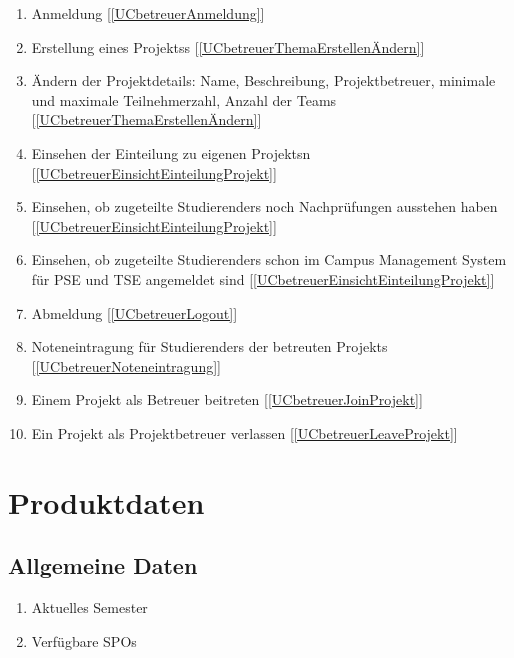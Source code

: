 \documentclass[parskip=full]{scrartcl}
\newcommand{\swtLabel}[1]{\textbf{/#1\arabic*0/}}
\newcommand{\testRef}[1]{[\ref{#1}]}
\begin{document}
\begin{enumerate}[label=\swtLabel{FA}, resume]
  \item Anmeldung  \label{FAbetreuerAnmeldung} \testRef{UCbetreuerAnmeldung}
  \item Erstellung eines \glspl{Projekt}s \label{FAbetreuerAddProjekt}
  \testRef{UCbetreuerThemaErstellenÄndern}
  \item Ändern der \gls{Projektdetails}: Name, Beschreibung, \gls{Projektbetreuer},
        minimale und maximale Teilnehmerzahl, Anzahl der \glspl{Team}
        \label{FAbetreuerChangeProjekt} \testRef{UCbetreuerThemaErstellenÄndern}%
  \item Einsehen der \gls{Einteilung} zu eigenen \glspl{Projekt}n
  \label{FAbetreuerEinsichtEinteilung}
  \testRef{UCbetreuerEinsichtEinteilungProjekt}
  \item Einsehen, ob zugeteilte \glspl{Studierender} noch Nachprüfungen
  ausstehen haben \label{FAbetreuerEinsichtNachpruefung} \testRef{UCbetreuerEinsichtEinteilungProjekt}
  \item Einsehen, ob zugeteilte \glspl{Studierender} schon im Campus Management
  System für \gls{PSE} und \gls{TSE} angemeldet sind
  \label{FAbetreuerEinsichtTSE} \testRef{UCbetreuerEinsichtEinteilungProjekt}
  \item Abmeldung \label{FAbetreuerAbmeldung} \testRef{UCbetreuerLogout}
  \item Noteneintragung für \glspl{Studierender} der betreuten \glspl{Projekt}
  \label{FAbetreuerNoten} \testRef{UCbetreuerNoteneintragung}
  \item Einem \gls{Projekt} als Betreuer beitreten \label{FAbetreuerJoinProjekt}
  \testRef{UCbetreuerJoinProjekt}
  \item Ein \gls{Projekt} als \gls{Projektbetreuer} verlassen \label{FAbetreuerLeaveprojekt}
  \testRef{UCbetreuerLeaveProjekt}

\end{enumerate}



\section{Produktdaten}

\subsection{Allgemeine Daten}
\begin{enumerate}[label=\swtLabel{D}]
  \item Aktuelles Semester
  \item Verfügbare \glspl{SPO}
\end{enumerate}
\end{document}
